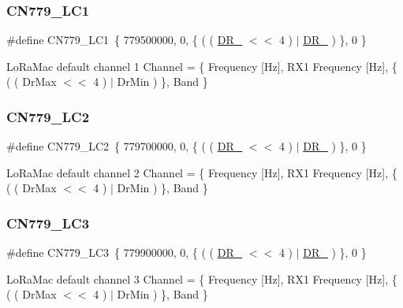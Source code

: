 \subsubsection{\texorpdfstring{C\+N779\+\_\+\+L\+C1}{CN779\_LC1}}
{\footnotesize\ttfamily \#define C\+N779\+\_\+\+L\+C1~\{ 779500000, 0, \{ ( ( \hyperlink{group__REGION_ga872e12c82020c02a7f70a1c6ed1375df}{D\+R\+\_} $<$$<$ 4 ) $\vert$ \hyperlink{group__REGION_ga6c4ef966b4f3d5eb7597b087f2b97095}{D\+R\+\_} ) \}, 0 \}}

Lo\+Ra\+Mac default channel 1 Channel = \{ Frequency \mbox{[}Hz\mbox{]}, R\+X1 Frequency \mbox{[}Hz\mbox{]}, \{ ( ( Dr\+Max $<$$<$ 4 ) $\vert$ Dr\+Min ) \}, Band \} \mbox{\label{group__REGIONCN779_ga758c5da7fe1372388ab9476835b4b4d2}} 
\subsubsection{\texorpdfstring{C\+N779\+\_\+\+L\+C2}{CN779\_LC2}}
{\footnotesize\ttfamily \#define C\+N779\+\_\+\+L\+C2~\{ 779700000, 0, \{ ( ( \hyperlink{group__REGION_ga872e12c82020c02a7f70a1c6ed1375df}{D\+R\+\_} $<$$<$ 4 ) $\vert$ \hyperlink{group__REGION_ga6c4ef966b4f3d5eb7597b087f2b97095}{D\+R\+\_} ) \}, 0 \}}

Lo\+Ra\+Mac default channel 2 Channel = \{ Frequency \mbox{[}Hz\mbox{]}, R\+X1 Frequency \mbox{[}Hz\mbox{]}, \{ ( ( Dr\+Max $<$$<$ 4 ) $\vert$ Dr\+Min ) \}, Band \} \mbox{\label{group__REGIONCN779_ga8e9d424722db59d84a7d122e95f3cce7}} 
\subsubsection{\texorpdfstring{C\+N779\+\_\+\+L\+C3}{CN779\_LC3}}
{\footnotesize\ttfamily \#define C\+N779\+\_\+\+L\+C3~\{ 779900000, 0, \{ ( ( \hyperlink{group__REGION_ga872e12c82020c02a7f70a1c6ed1375df}{D\+R\+\_} $<$$<$ 4 ) $\vert$ \hyperlink{group__REGION_ga6c4ef966b4f3d5eb7597b087f2b97095}{D\+R\+\_} ) \}, 0 \}}

Lo\+Ra\+Mac default channel 3 Channel = \{ Frequency \mbox{[}Hz\mbox{]}, R\+X1 Frequency \mbox{[}Hz\mbox{]}, \{ ( ( Dr\+Max $<$$<$ 4 ) $\vert$ Dr\+Min ) \}, Band \} \mbox{\label{group__REGIONCN779_ga6bac9924ad75dba200876f5ddcb8d91e}} 
